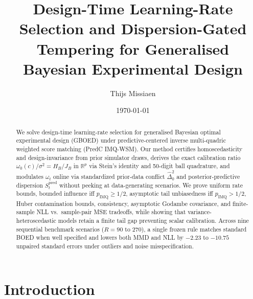 \documentclass[11pt,a4paper,reqno]{amsart}
\title[Design-Time Learning-Rate Selection for GBOED]{Design-Time Learning-Rate Selection and Dispersion-Gated Tempering for Generalised Bayesian Experimental Design}
\author{Thijs Missiaen}
\date{\today}
\theoremstyle{definition}
\theoremstyle{remark}
\begin{document}
\begin{abstract}
We solve design-time learning-rate selection for generalised Bayesian optimal experimental design (GBOED) under predictive-centered inverse multi-quadric weighted score matching (PredC IMQ-WSM). Our method certifies homoscedasticity and design-invariance from prior simulator draws, derives the exact calibration ratio $\omega_0(c)/\sigma^2 = H_B/J_B$ in $\mathbb{R}^p$ via Stein's identity and 50-digit ball quadrature, and modulates $\omega_t$ online via standardized prior-data conflict $\hat{\Delta}_0^2$ and posterior-predictive dispersion $S_t^{\mathrm{pred}}$ without peeking at data-generating scenarios. We prove uniform rate bounds, bounded influence iff $p_{\mathrm{IMQ}} \ge 1/2$, asymptotic tail unbiasedness iff $p_{\mathrm{IMQ}} > 1/2$, Huber contamination bounds, consistency, asymptotic Godambe covariance, and finite-sample NLL vs.\ sample-pair MSE tradeoffs, while showing that variance-heteroscedastic models retain a finite tail gap preventing scalar calibration. Across nine sequential benchmark scenarios ($R=90$ to $270$), a single frozen rule matches standard BOED when well specified and lowers both MMD and NLL by $-2.23$ to $-10.75$ unpaired standard errors under outliers and noise misspecification.
\end{abstract}

\maketitle

\section{Introduction}\label{sec:intro}
\end{document}
